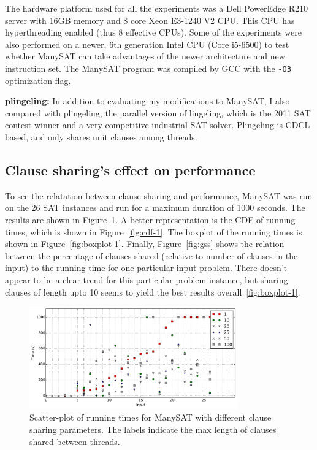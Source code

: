 \documentclass{article}
\begin{document}
The hardware platform used for all the experiments was a Dell
PowerEdge R210 server with 16GB memory and 8 core Xeon E3-1240 V2
CPU. This CPU has hyperthreading enabled (thus 8 effective CPUs). Some
of the experiments were also performed on a newer, 6th generation
Intel CPU (Core i5-6500) to test whether ManySAT can take advantages
of the newer architecture and new instruction set. The ManySAT program
was compiled by GCC with the \texttt{-O3} optimization flag.


\textbf{plingeling:} In addition to evaluating my modifications to
ManySAT, I also compared with plingeling, the parallel version of
lingeling, which is the 2011 SAT contest winner and a very competitive
industrial SAT solver. Plingeling is CDCL based, and only shares unit
clauses among threads.

\subsection{Clause sharing's effect on performance}

To see the relatation between clause sharing and performance, ManySAT
was run on the 26 SAT instances and run for a maximum duration of 1000
seconds. The results are shown in Figure~\ref{fig:scatter-1}. A better
representation is the CDF of running times, which is shown in
Figure~\ref{fig:cdf-1}. The boxplot of the running times is shown in
Figure~\ref{fig:boxplot-1}. Finally, Figure~\ref{fig:gss} shows the
relation between the percentage of clauses shared (relative to number
of clauses in the input) to the running time for one particular input
problem. There doesn't appear to be a clear trend for this particular
problem instance, but sharing clauses of length upto 10 seems to yield
the best results overall~\ref{fig:boxplot-1}. 


\begin{figure}[h]
  \centering
  \includegraphics[width=0.8\textwidth]{../figs/scatter_all.pdf}
  \caption{Scatter-plot of running times for ManySAT with different clause sharing parameters. The labels indicate the max length of clauses shared between threads.}
  \label{fig:scatter-1}
\end{figure}
\end{document}
